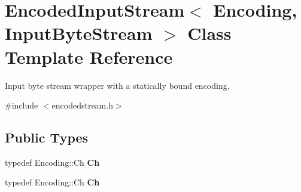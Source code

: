 \hypertarget{classEncodedInputStream}{}\section{Encoded\+Input\+Stream$<$ Encoding, Input\+Byte\+Stream $>$ Class Template Reference}
\label{classEncodedInputStream}


Input byte stream wrapper with a statically bound encoding.  




{\ttfamily \#include $<$encodedstream.\+h$>$}

\subsection*{Public Types}
\begin{DoxyCompactItemize}
\item 
\mbox{\label{classEncodedInputStream_acc387a1364390da244bbb1ab07bdceca}} 
typedef Encoding\+::\+Ch {\bfseries Ch}
\item 
\mbox{\label{classEncodedInputStream_acc387a1364390da244bbb1ab07bdceca}} 
typedef Encoding\+::\+Ch {\bfseries Ch}
\end{DoxyCompactItemize}
